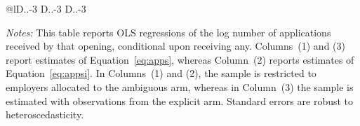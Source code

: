 \begin{table}[!htbp]
{\begin{tabular}{@{\extracolsep{5pt}}lD{.}{.}{-3} D{.}{.}{-3} D{.}{.}{-3} }
\hline \\[-1.8ex] 
\end{tabular}
}\centering
\begin{minipage}{0.9875\linewidth} 
 \emph{Notes:} This table reports OLS regressions of the log number of applications received by that opening, conditional upon receiving any.
Columns~(1) and (3) report estimates of Equation~\ref{eq:apps}, whereas Column~(2) reports estimates of Equation~\ref{eq:appsi}. 
In Columns~(1) and (2), the sample is restricted to employers allocated to the ambiguous arm, whereas in Column~(3) the sample is estimated with observations from the explicit arm. \ambigdef \explicitdef \shownprefdef \tierdef Standard errors are robust to heteroscedasticity.  \starlanguage 
 \end{minipage}
\end{table}
